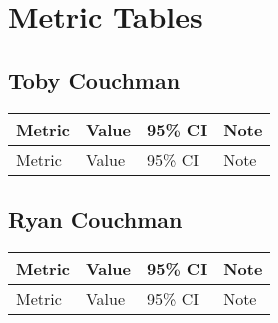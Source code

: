 \section{Metric Tables}

\subsection{Toby Couchman}
\begin{longtable}{L{3.6cm} C{2.3cm} C{3.6cm} L{5.5cm}}
\toprule
Metric & Value & 95\% CI & Note\\
\midrule
\endfirsthead
\toprule
Metric & Value & 95\% CI & Note\\
\midrule
\endhead

\bottomrule
\end{longtable}

\subsection{Ryan Couchman}
\begin{longtable}{L{3.6cm} C{2.3cm} C{3.6cm} L{5.5cm}}
\toprule
Metric & Value & 95\% CI & Note\\
\midrule
\endfirsthead
\toprule
Metric & Value & 95\% CI & Note\\
\midrule
\endhead

\bottomrule
\end{longtable}

